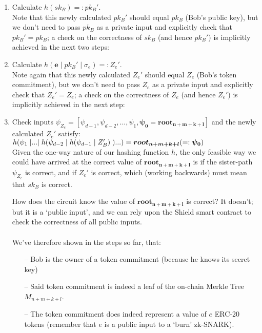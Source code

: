 \documentclass{article}
\DeclarePairedDelimiter\br{(}{)}
\begin{document}
\begin{enumerate}
  \item Calculate $h(sk_B) =: pk_B'$.\\
    Note that this newly calculated $pk_B'$ should equal $pk_B$ (Bob's public key), but we don't need to pass $pk_B$ as a private input and explicitly check that $pk_B'=pk_B$; a check on the correctness of $sk_B$ (and hence $pk_B'$) is implicitly achieved in the next two steps:
  \item Calculate $h(\bm{e}\;|\;pk_B'\;|\;\sigma_e) =: Z_e'$.\\
    Note again that this newly calculated $Z_e'$ should equal $Z_e$ (Bob's token commitment), but we don't need to pass $Z_e$ as a private input and explicitly check that $Z_e'=Z_e$; a check on the correctness of $Z_e$ (and hence $Z_e'$) is implicitly achieved in the next step:
  \item Check inputs $\psi_{Z_e}=[\psi_{d-1}, \psi_{d-2},..., \psi_{1}, \bm{\psi_{0}=root_{n+m+k+l}}]$ and the newly calculated $Z_e'$ satisfy:\\
    $h\br*{\psi_{1}\;|...|\;h\br*{\psi_{d-2}\;|\;h\br*{\psi_{d-1}\;|\;Z_B'}\;}...} = \bm{root_{n+m+k+l}} ( =: \bm{\psi_{0}})$\\
    Given the one-way nature of our hashing function $h$, the only feasible way we could have arrived at the correct value of $\bm{root_{n+m+k+l}}$ is if the sister-path $\psi_{Z_e}$ is correct, and if $Z_e'$ is correct, which (working backwards) must mean that $sk_B$ is correct.

    How does the circuit know the value of $\bm{root_{n+m+k+l}}$ is correct? It doesn't; but it is a `public input', and we can rely upon the Shield smart contract to check the correctness of all public inputs.\\
  \\
  We've therefore shown in the steps so far, that:
  \begin{itemize}
    \item[--] Bob is the owner of a token commitment (because he knows its secret key)
    \item[--] Said token commitment is indeed a leaf of the on-chain Merkle Tree $M_{n+m+k+l}$.
    \item[--] The token commitment does indeed represent a value of $e$ ERC-20 tokens (remember that $e$ is a public input to a `burn' zk-SNARK).
  \end{itemize}


\end{enumerate}
\end{document}
